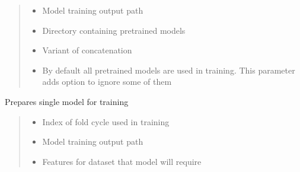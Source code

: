 \documentclass[letterpaper,10pt,english]{sphinxmanual}
\begin{document}
\begin{fulllineitems}
\begin{fulllineitems}
\begin{quote}
\begin{description}
\begin{itemize}
\item {} 
\sphinxAtStartPar
{} \textendash{} Model training output path

\item {} 
\sphinxAtStartPar
{} \textendash{} Directory containing pretrained models

\item {} 
\sphinxAtStartPar
{} \textendash{} Variant of concatenation

\item {} 
\sphinxAtStartPar
{} \textendash{} By default all pretrained models are used in training. This parameter adds option to ignore some of them

\end{itemize}

\end{description}\end{quote}

\end{fulllineitems}


\begin{fulllineitems}
\label{\detokenize{net:net.UVANEMO.prepare_data_single}}
\pysigstartsignatures
{}
\pysigstopsignatures
\sphinxAtStartPar
Prepares single model for training
\begin{quote}\begin{description}
\begin{itemize}
\item {} 
\sphinxAtStartPar
{} \textendash{} Index of fold cycle used in training

\item {} 
\sphinxAtStartPar
{} \textendash{} Model training output path

\item {} 
\sphinxAtStartPar
{} \textendash{} Features for dataset that model will require


\end{itemize}
\end{description}
\end{quote}
\end{fulllineitems}
\end{fulllineitems}
\end{document}
